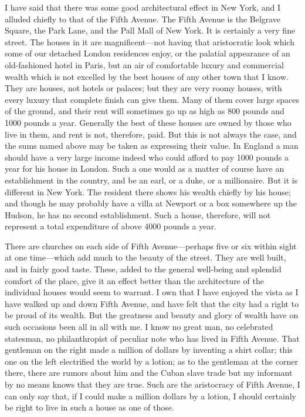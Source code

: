 I have said that there was some good architectural effect in New
York, and I alluded chiefly to that of the Fifth Avenue.  The Fifth
Avenue is the Belgrave Square, the Park Lane, and the Pall Mall of
New York.  It is certainly a very fine street.  The houses in it
are magnificent---not having that aristocratic look which some of
our detached London residences enjoy, or the palatial appearance of
an old-fashioned hotel in Paris, but an air of comfortable luxury
and commercial wealth which is not excelled by the best houses of
any other town that I know.  They are houses, not hotels or
palaces; but they are very roomy houses, with every luxury that
complete finish can give them.  Many of them cover large spaces of
the ground, and their rent will sometimes go up as high as 800
pounds and 1000 pounds a year.  Generally the best of these houses
are owned by those who live in them, and rent is not, therefore,
paid.  But this is not always the case, and the sums named above
may be taken as expressing their value.  In England a man should
have a very large income indeed who could afford to pay 1000 pounds
a year for his house in London.  Such a one would as a matter of
course have an establishment in the country, and be an earl, or a
duke, or a millionaire.  But it is different in New York.  The
resident there shows his wealth chiefly by his house; and though he
may probably have a villa at Newport or a box somewhere up the
Hudson, he has no second establishment.  Such a house, therefore,
will not represent a total expenditure of above 4000 pounds a year.

There are churches on each side of Fifth Avenue---perhaps five or
six within sight at one time---which add much to the beauty of the
street.  They are well built, and in fairly good taste.  These,
added to the general well-being and splendid comfort of the place,
give it an effect better than the architecture of the individual
houses would seem to warrant.  I own that I have enjoyed the vista
as I have walked up and down Fifth Avenue, and have felt that the
city had a right to be proud of its wealth.  But the greatness and
beauty and glory of wealth have on such occasions been all in all
with me.  I know no great man, no celebrated statesman, no
philanthropist of peculiar note who has lived in Fifth Avenue.
That gentleman on the right made a million of dollars by inventing
a shirt collar; this one on the left electrified the world by a
lotion; as to the gentleman at the corner there, there are rumors
about him and the Cuban slave trade but my informant by no means
knows that they are true.  Such are the aristocracy of Fifth
Avenue, I can only say that, if I could make a million dollars by a
lotion, I should certainly be right to live in such a house as one
of those.

